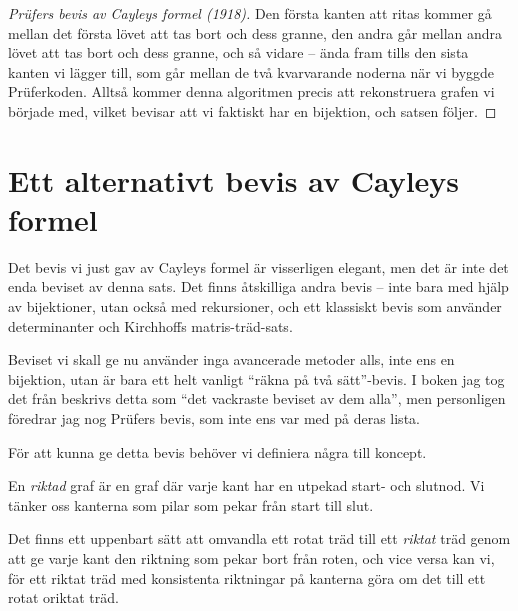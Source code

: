 \documentclass[nobib]{tufte-handout}
\begin{document}
\begin{proof}[Prüfers bevis av Cayleys formel (1918)]
    Den första kanten att ritas kommer gå mellan det första lövet att tas bort och dess granne, den andra går mellan andra lövet att tas bort och dess granne, och så vidare -- ända fram tills den sista kanten vi lägger till, som går mellan de två kvarvarande noderna när vi byggde Prüferkoden. Alltså kommer denna algoritmen precis att rekonstruera grafen vi började med, vilket bevisar att vi faktiskt har en bijektion, och satsen följer.
\end{proof}

\section{Ett alternativt bevis av Cayleys formel}

Det bevis vi just gav av Cayleys formel är visserligen elegant, men det är inte det enda beviset av denna sats. Det finns åtskilliga andra bevis -- inte bara med hjälp av bijektioner, utan också med rekursioner, och ett klassiskt bevis som använder determinanter och Kirchhoffs matris-träd-sats.

Beviset vi skall ge nu använder inga avancerade metoder alls, inte ens en bijektion, utan är bara ett helt vanligt ``räkna på två sätt''-bevis. I boken jag tog det från
beskrivs detta som ``det vackraste beviset av dem alla'', men personligen föredrar jag nog Prüfers bevis, som inte ens var med på deras lista.

För att kunna ge detta bevis behöver vi definiera några till koncept.

\begin{definition}
    En \emph{riktad} graf är en graf där varje kant har en utpekad start- och slutnod. Vi tänker oss kanterna som pilar som pekar från start till slut.

    Det finns ett uppenbart sätt att omvandla ett rotat träd till ett \emph{riktat} träd genom att ge varje kant den riktning som pekar bort från roten, och vice versa kan vi, för ett riktat träd med konsistenta riktningar på kanterna göra om det till ett rotat oriktat träd.
\end{definition}
\end{document}
